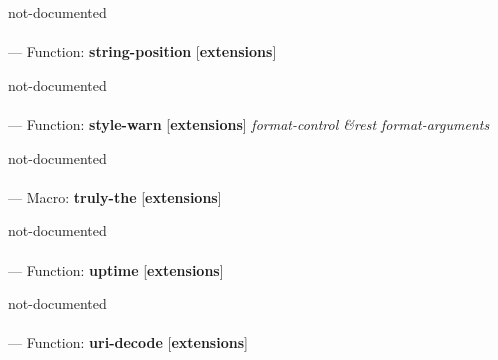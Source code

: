 \begin{adjustwidth}{5em}{5em}
not-documented
\end{adjustwidth}

\paragraph{}
\label{EXTENSIONS:STRING-POSITION}
--- Function: \textbf{string-position} [\textbf{extensions}] \textit{}

\begin{adjustwidth}{5em}{5em}
not-documented
\end{adjustwidth}

\paragraph{}
\label{EXTENSIONS:STYLE-WARN}
--- Function: \textbf{style-warn} [\textbf{extensions}] \textit{format-control \&rest format-arguments}

\begin{adjustwidth}{5em}{5em}
not-documented
\end{adjustwidth}

\paragraph{}
\label{EXTENSIONS:TRULY-THE}
--- Macro: \textbf{truly-the} [\textbf{extensions}] \textit{}

\begin{adjustwidth}{5em}{5em}
not-documented
\end{adjustwidth}

\paragraph{}
\label{EXTENSIONS:UPTIME}
--- Function: \textbf{uptime} [\textbf{extensions}] \textit{}

\begin{adjustwidth}{5em}{5em}
not-documented
\end{adjustwidth}

\paragraph{}
\label{EXTENSIONS:URI-DECODE}
--- Function: \textbf{uri-decode} [\textbf{extensions}] \textit{}


